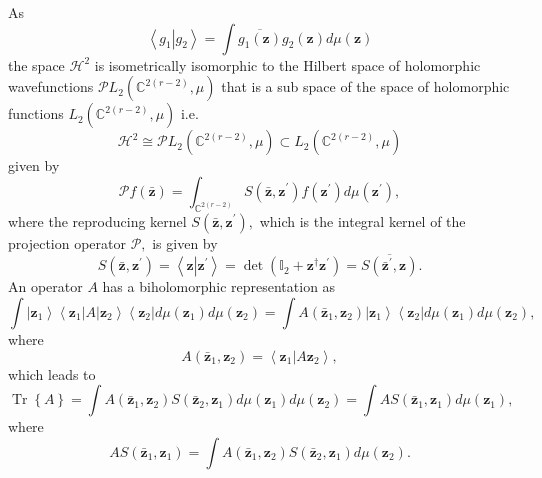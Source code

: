 \documentclass[aps,preprint]{revtex4}%
\begin{document}
As
\begin{equation}
\left\langle g_{1}\left\vert g_{2}\right.  \right\rangle =\int\overline
{g_{1}\left(  \mathbf{z}\right)  }g_{2}\left(  \mathbf{z}\right)  d\mu\left(
\mathbf{z}\right)
\end{equation}
the space $\mathcal{H}^{2}$ is isometrically isomorphic to the Hilbert space
of holomorphic wavefunctions $\mathcal{P}L_{2}\left(  \mathbb{C}^{2\left(
r-2\right)  },\mu\right)  $ that is a sub space of the space of holomorphic
functions $L_{2}\left(  \mathbb{C}^{2\left(  r-2\right)  },\mu\right)  $ i.e.
\begin{equation}
\mathcal{H}^{2}\cong\mathcal{P}L_{2}\left(  \mathbb{C}^{2\left(  r-2\right)
},\mu\right)  \subset L_{2}\left(  \mathbb{C}^{2\left(  r-2\right)  }%
,\mu\right)
\end{equation}
given by
\begin{equation}
\mathcal{P}f\left(  \mathbf{\bar{z}}\right)  =\int_{\mathbb{C}^{2\left(
r-2\right)  }}S\left(  \mathbf{\bar{z},z}^{\prime}\right)  f\left(
\mathbf{z}^{\prime}\right)  d\mu\left(  \mathbf{z}^{\prime}\right)  ,
\end{equation}
where the reproducing kernel $S\left(  \mathbf{\bar{z},z}^{\prime}\right)  ,$
which is the integral kernel of the projection operator $\mathcal{P},$ is
given by
\begin{equation}
S\left(  \mathbf{\bar{z},z}^{\prime}\right)  =\left\langle \mathbf{z}%
\left\vert \mathbf{z}^{\prime}\right.  \right\rangle =\det\left(
\mathbb{I}_{2}+\mathbf{z}^{\dagger}\mathbf{z}^{\prime}\right)  =\overline
{S\left(  \mathbf{\bar{z}}^{\prime},\mathbf{z}\right)  }.
\end{equation}
An operator $A$ has a biholomorphic representation as
\begin{equation}
\int\left\vert \mathbf{z}_{1}\right\rangle \left\langle \mathbf{z}%
_{1}\right\vert A\left\vert \mathbf{z}_{2}\right\rangle \left\langle
\mathbf{z}_{2}\right\vert d\mu\left(  \mathbf{z}_{1}\right)  d\mu\left(
\mathbf{z}_{2}\right)  =\int A\left(  \mathbf{\bar{z}}_{1},\mathbf{z}%
_{2}\right)  \left\vert \mathbf{z}_{1}\right\rangle \left\langle
\mathbf{z}_{2}\right\vert d\mu\left(  \mathbf{z}_{1}\right)  d\mu\left(
\mathbf{z}_{2}\right)  ,
\end{equation}
where
\begin{equation}
A\left(  \mathbf{\bar{z}}_{1},\mathbf{z}_{2}\right)  =\left\langle
\mathbf{z}_{1}\left\vert A\mathbf{z}_{2}\right.  \right\rangle ,
\end{equation}
which leads to
\begin{equation}
\operatorname*{Tr}\left\{  A\right\}  =\int A\left(  \mathbf{\bar{z}}%
_{1},\mathbf{z}_{2}\right)  S\left(  \mathbf{\bar{z}}_{2},\mathbf{z}%
_{1}\right)  d\mu\left(  \mathbf{z}_{1}\right)  d\mu\left(  \mathbf{z}%
_{2}\right)  =\int AS\left(  \mathbf{\bar{z}}_{1},\mathbf{z}_{1}\right)
d\mu\left(  \mathbf{z}_{1}\right)  ,
\end{equation}
where
\begin{equation}
AS\left(  \mathbf{\bar{z}}_{1},\mathbf{z}_{1}\right)  =\int A\left(
\mathbf{\bar{z}}_{1},\mathbf{z}_{2}\right)  S\left(  \mathbf{\bar{z}}%
_{2},\mathbf{z}_{1}\right)  d\mu\left(  \mathbf{z}_{2}\right)  .
\end{equation}
\end{document}
